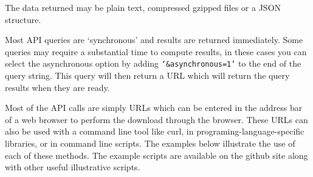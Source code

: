 The data returned may be plain text, compressed gzipped files or a JSON structure. 

Most API queries are `synchronous' and results are returned immediately. Some queries may require a substantial time to compute results, in these cases you can select the asynchronous option by adding \texttt{`\&asynchronous=1'} to the end of the query string. This query will then return a URL which will return the query results when they are ready.

Most of the API calls are simply URLs which can be entered in the address bar of a web browser to perform the download through the browser. These URLs can also be used with a command line tool like curl, in programing-language-specific libraries, or in command line scripts. The examples below illustrate the use of each of these methods. The example scripts are available on the github site along with other useful illustrative scripts.

